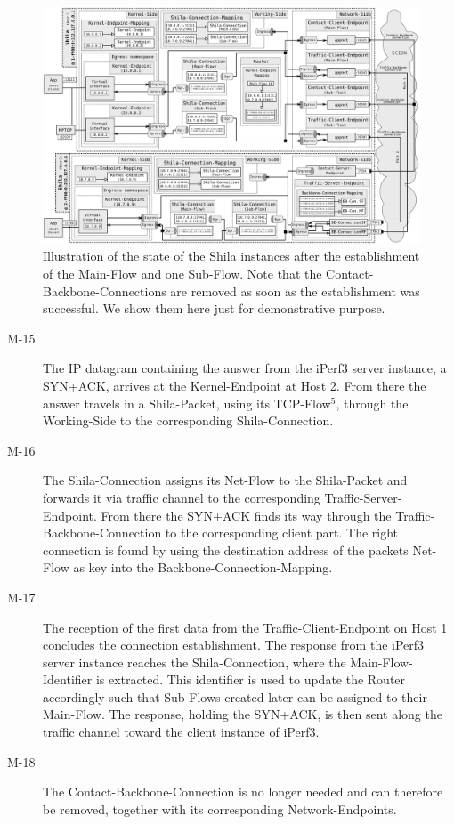 	\begin{landscape}
		\begin{figure}
			\begin{center}
				\def\svgwidth{1\textwidth}
				\includegraphics[scale=0.2]{../illustrations/implementation/ConnectionEstablishment.pdf}   
				\caption[]{Illustration of the state of the Shila instances after the establishment of the Main-Flow and one Sub-Flow. Note that the Contact-Backbone-Connections are removed as soon as the establishment was successful. We show them here just for demonstrative purpose.}
				\label{fig:ConnectionEstablishment}
			\end{center}
		\end{figure}
	\end{landscape}
\begin{description}		
	\item[M-15] The IP datagram containing the answer from the iPerf3 server instance, a SYN+ACK, arrives at the Kernel-Endpoint at Host 2. From there the answer travels in a Shila-Packet, using its TCP-Flow$^{5}$, through the Working-Side to the corresponding Shila-Connection.
	\item[M-16] The Shila-Connection assigns its Net-Flow to the Shila-Packet and forwards it via traffic channel to the corresponding Traffic-Server-Endpoint. From there the SYN+ACK finds its way through the Traffic-Backbone-Connection to the corresponding client part. The right connection is found by using the destination address of the packets Net-Flow as key into the Backbone-Connection-Mapping.
	\item[M-17] The reception of the first data from the Traffic-Client-Endpoint on Host 1 concludes the connection establishment. The response from the iPerf3 server instance reaches the Shila-Connection, where the Main-Flow-Identifier is extracted. This identifier is used to update the Router accordingly such that Sub-Flows created later can be assigned to their Main-Flow. The response, holding the SYN+ACK, is then sent along the traffic channel toward the client instance of iPerf3.
	\item[M-18] The Contact-Backbone-Connection is no longer needed and can therefore be removed, together with its corresponding Network-Endpoints.
\end{description}

